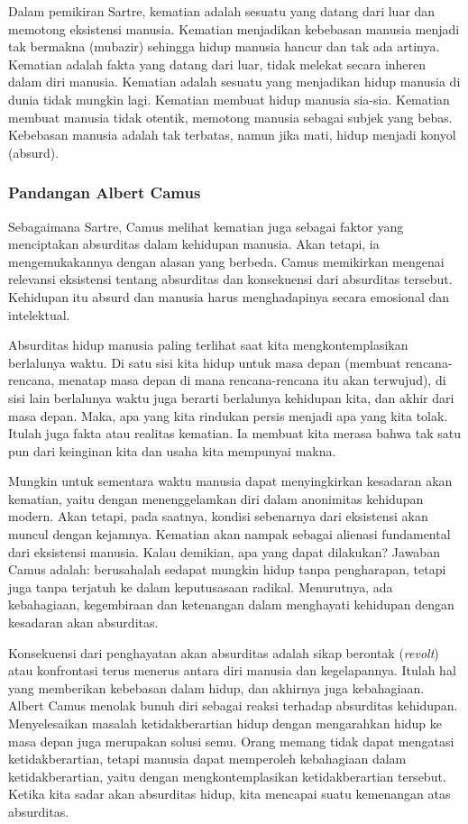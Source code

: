 \documentclass[10pt,a4paper]{article}
\begin{document}
\begin{multicols}{2}
Dalam pemikiran Sartre, kematian adalah sesuatu yang datang dari luar
dan memotong eksistensi manusia. Kematian menjadikan kebebasan manusia
menjadi tak bermakna (mubazir) sehingga hidup manusia hancur dan tak ada
artinya. Kematian adalah fakta yang datang dari luar, tidak melekat
secara inheren dalam diri manusia. Kematian adalah sesuatu yang
menjadikan hidup manusia di dunia tidak mungkin lagi. Kematian membuat
hidup manusia sia-sia. Kematian membuat manusia tidak otentik, memotong
manusia sebagai subjek yang bebas. Kebebasan manusia adalah tak
terbatas, namun jika mati, hidup menjadi konyol (absurd).

\hypertarget{pandangan-albert-camus}{%
\subsubsection{Pandangan Albert Camus}\label{pandangan-albert-camus}}

Sebagaimana Sartre, Camus melihat kematian juga sebagai faktor yang
menciptakan absurditas dalam kehidupan manusia. Akan tetapi, ia
mengemukakannya dengan alasan yang berbeda. Camus memikirkan mengenai
relevansi eksistensi tentang absurditas dan konsekuensi dari absurditas
tersebut. Kehidupan itu absurd dan manusia harus menghadapinya secara
emosional dan intelektual.

Absurditas hidup manusia paling terlihat saat kita mengkontemplasikan
berlalunya waktu. Di satu sisi kita hidup untuk masa depan (membuat
rencana-rencana, menatap masa depan di mana rencana-rencana itu akan
terwujud), di sisi lain berlalunya waktu juga berarti berlalunya
kehidupan kita, dan akhir dari masa depan. Maka, apa yang kita rindukan
persis menjadi apa yang kita tolak. Itulah juga fakta atau realitas
kematian. Ia membuat kita merasa bahwa tak satu pun dari keinginan kita
dan usaha kita mempunyai makna.

Mungkin untuk sementara waktu manusia dapat menyingkirkan kesadaran akan
kematian, yaitu dengan menenggelamkan diri dalam anonimitas kehidupan
modern. Akan tetapi, pada saatnya, kondisi sebenarnya dari eksistensi
akan muncul dengan kejamnya. Kematian akan nampak sebagai alienasi
fundamental dari eksistensi manusia. Kalau demikian, apa yang dapat
dilakukan? Jawaban Camus adalah: berusahalah sedapat mungkin hidup tanpa
pengharapan, tetapi juga tanpa terjatuh ke dalam keputusasaan radikal.
Menurutnya, ada kebahagiaan, kegembiraan dan ketenangan dalam menghayati
kehidupan dengan kesadaran akan absurditas.

Konsekuensi dari penghayatan akan absurditas adalah sikap berontak
(\emph{revolt}) atau konfrontasi terus menerus antara diri manusia dan
kegelapannya. Itulah hal yang memberikan kebebasan dalam hidup, dan
akhirnya juga kebahagiaan. Albert Camus menolak bunuh diri sebagai
reaksi terhadap absurditas kehidupan. Menyelesaikan masalah
ketidakberartian hidup dengan mengarahkan hidup ke masa depan juga
merupakan solusi semu. Orang memang tidak dapat mengatasi
ketidakberartian, tetapi manusia dapat memperoleh kebahagiaan dalam
ketidakberartian, yaitu dengan mengkontemplasikan ketidakberartian
tersebut. Ketika kita sadar akan absurditas hidup, kita mencapai suatu
kemenangan atas absurditas.


\end{multicols}
\end{document}
